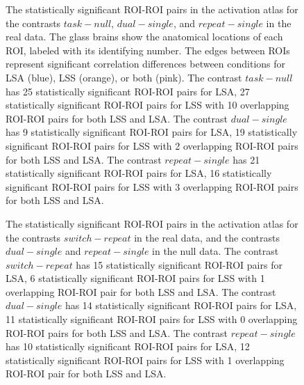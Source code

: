 \documentclass[phd,appendix,figures]{uithesis}
\begin{document}
\begin{figure}[H]
  \centering



  \caption[All contrasts for all atlases for all data...]{
   The statistically significant ROI-ROI pairs in the activation atlas for the contrasts $task - null$, $dual - single$,
   and $repeat - single$ in the real data.
   The glass brains show the anatomical locations of each ROI,
   labeled with its identifying number.
   The edges between ROIs represent significant correlation differences
   between conditions for LSA (blue), LSS (orange), or both (pink).
   The contrast $task - null$ has 25 statistically significant ROI-ROI
   pairs for LSA, 27 statistically significant ROI-ROI pairs
   for LSS with 10 overlapping ROI-ROI pairs for both LSS and LSA.
   The contrast $dual - single$ has 9 statistically significant ROI-ROI
   pairs for LSA, 19 statistically significant ROI-ROI pairs
   for LSS with 2 overlapping ROI-ROI pairs for both LSS and LSA.
   The contrast $repeat - single$ has 21 statistically significant ROI-ROI
   pairs for LSA, 16 statistically significant ROI-ROI pairs
   for LSS with 3 overlapping ROI-ROI pairs for both LSS and LSA.
  }
  \label{fig:significant-contrasts1}
\end{figure}

\begin{figure}[H]
  \ContinuedFloat
  \centering



  \caption[All contrasts for all atlases for all data continued...]{
      The statistically significant ROI-ROI pairs in the activation atlas for the contrasts
      $switch - repeat$ in the real data, and the contrasts $dual - single$ and $repeat - single$
      in the null data.
      The contrast $switch - repeat$ has 15 statistically significant ROI-ROI
      pairs for LSA, 6 statistically significant ROI-ROI pairs
      for LSS with 1 overlapping ROI-ROI pair for both LSS and LSA.
      The contrast $dual - single$ has 14 statistically significant ROI-ROI
      pairs for LSA, 11 statistically significant ROI-ROI pairs
      for LSS with 0 overlapping ROI-ROI pairs for both LSS and LSA.
      The contrast $repeat - single$ has 10 statistically significant ROI-ROI
      pairs for LSA, 12 statistically significant ROI-ROI pairs
      for LSS with 1 overlapping ROI-ROI pair for both LSS and LSA.
  }
  \label{fig:significant-contrasts2}
\end{figure}
\end{document}
